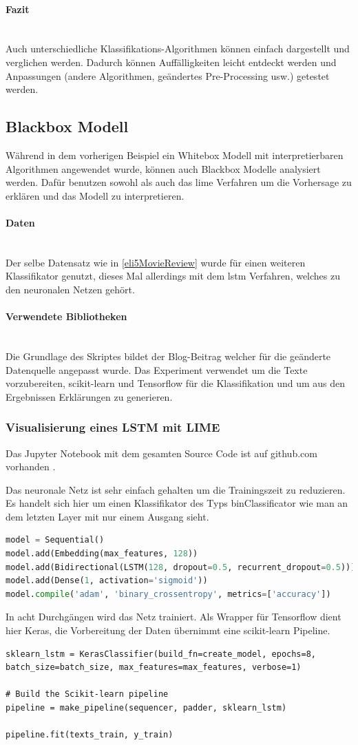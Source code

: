 \documentclass[
  12pt, %
  a4paper, %
  oneside, %
  openany, 
  numbers=noenddot, %
  BCOR=5mm, %
  parskip=half*, %
  thesis, %
]{bfhbook}
\newcommand{\parag}[1]{\paragraph*{#1}\mbox{}\\}
\begin{document}
\parag{Fazit}
Auch unterschiedliche Klassifikations-Algorithmen können einfach dargestellt und verglichen werden. Dadurch können Auffälligkeiten leicht entdeckt werden und Anpassungen (andere Algorithmen, geändertes Pre-Processing usw.) getestet werden. 

\subsection{Blackbox Modell}
Während in dem vorherigen Beispiel ein \Gls{Whitebox} Modell mit interpretierbaren Algorithmen angewendet wurde, können auch \Gls{Blackbox} Modelle analysiert werden. Dafür benutzen sowohl \cite{ELI5} als auch \cite{lime} das \acrshort{lime} Verfahren um die Vorhersage zu erklären und das Modell zu interpretieren.

\parag{Daten}
Der selbe Datensatz wie in \ref{eli5MovieReview} wurde für einen weiteren Klassifikator genutzt, dieses Mal allerdings mit dem \acrfull{lstm} Verfahren, welches zu den neuronalen Netzen gehört. 

\parag{Verwendete Bibliotheken}
Die Grundlage des Skriptes bildet der Blog-Beitrag \parencite{nThLIME} welcher für die geänderte Datenquelle angepasst wurde. 
Das Experiment verwendet \cite{nltk} um die Texte vorzubereiten, scikit-learn \cite{scikit-learnLink} und Tensorflow \cite{TensorFlow} für die Klassifikation und \cite{ELI5} um aus den Ergebnissen Erklärungen zu generieren. 


\subsubsection*{Visualisierung eines LSTM  mit LIME}
Das Jupyter Notebook mit dem gesamten Source Code ist auf github.com vorhanden \parencite{textClassLSTM}.
 
Das neuronale Netz ist sehr einfach gehalten um die Trainingszeit zu reduzieren. Es handelt sich hier um einen Klassifikator des Typs \Gls{binClassificator} wie man an dem letzten Layer mit nur einem Ausgang sieht.
\begin{lstlisting}[language=Python, caption=LSTM Modell für LIME Movie Sentiment Analyse]
model = Sequential()
model.add(Embedding(max_features, 128))
model.add(Bidirectional(LSTM(128, dropout=0.5, recurrent_dropout=0.5)))
model.add(Dense(1, activation='sigmoid'))
model.compile('adam', 'binary_crossentropy', metrics=['accuracy'])
\end{lstlisting}

In acht Durchgängen wird das Netz trainiert. Als Wrapper für Tensorflow dient hier Keras, die Vorbereitung der Daten übernimmt eine scikit-learn Pipeline.
\begin{lstlisting}
sklearn_lstm = KerasClassifier(build_fn=create_model, epochs=8, batch_size=batch_size, max_features=max_features, verbose=1)

# Build the Scikit-learn pipeline
pipeline = make_pipeline(sequencer, padder, sklearn_lstm)

pipeline.fit(texts_train, y_train)
\end{lstlisting}
\end{document}
